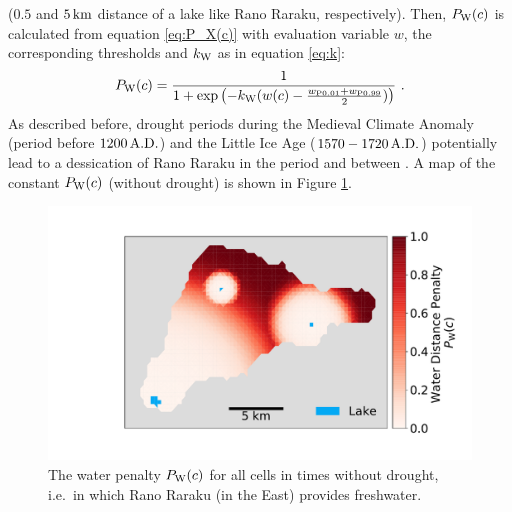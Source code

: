 ($0.5$ and $5\, {\rm km}$ distance of a lake like Rano Raraku, respectively).
Then, $P_{\rm W}(c)$ is calculated from equation \ref{eq:P_X(c)} with evaluation variable $w$, the corresponding thresholds and $k_{\rm W}$ as in equation \ref{eq:k}:
\begin{equation}
	P_{\rm W}(c) = \frac{1}{1+\exp\left( - k_{\rm W} (w(c)-\frac{w_{\rm P0.01}+w_{\rm P0.99}}{2}) \right)} \ .
\end{equation}
As described before, drought periods during the Medieval Climate Anomaly (period before $1200\, {\rm A.D.}$) and the Little Ice Age ($1570-1720 \, {\rm A.D.}$) potentially lead to a dessication of Rano Raraku in the period  and between \citep{Rull2020}. 
A map of the constant $P_{\rm W}(c)$ (without drought) is shown in Figure \ref{fig:plotpw}. 
\begin{figure}
	\centering
	\includegraphics[width=1\linewidth]{images/Plot_PW}
	\caption{The water penalty $P_{\rm W}(c)$ for all cells in times without drought, i.e.\ in which Rano Raraku (in the East) provides freshwater.}
	\label{fig:plotpw}
\end{figure}


